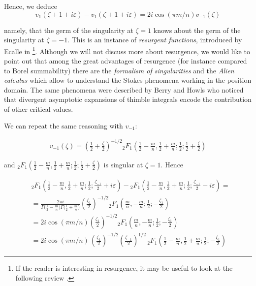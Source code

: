 \documentclass{article}
\theoremstyle{definition}
\begin{document}
Hence, we deduce  
\begin{equation}\label{resurgent-relation-1}
    v_1(\zeta+1+i\varepsilon)-v_1(\zeta+1+i\varepsilon)=2i \cos(\pi m/n)  v_{-1}(\zeta)
\end{equation}

namely, that the germ of the singularity at $\zeta=1$ knows about the germ of the singularity at $\zeta=-1$. This is an instance of \textit{resurgent functions}, introduced by Ecalle in \cite{EcalleI}\cite{EcalleII}\cite{EcalleIII}\footnote{If the reader is interesting in resurgence, it may be useful to look at the following review \cite{diverg-resurg-i}\cite{Dorigoni}\cite{aniceto2019primer}.}. Although we will not discuss more about resurgence, we would like to point out that among the great advantages of resurgence (for instance compared to Borel summability) there are the \textit{formalism of singularities} and the \textit{Alien calculus} which allow to understand the Stokes phenomena working in the position domain. The same phenomena were described by Berry and Howls \cite{berry1991hyperasymptotics} who noticed that divergent asymptotic expansions of thimble integrals encode the contribution of other critical values.

We can repeat the same reasoning with $v_{-1}$:

\begin{align*}
    v_{-1}(\zeta)=  \left(\frac{1}{2}+\frac{\zeta}{2}\right)^{-1/2} {}_2F_1\left(\frac{1}{2}-\frac{m}{n},\frac{1}{2}+\frac{m}{n};\frac{1}{2};\frac{1}{2}+\frac{\zeta}{2}\right)
\end{align*}

and ${}_2F_1\left(\frac{1}{2}-\frac{m}{n},\frac{1}{2}+\frac{m}{n};\frac{1}{2};\frac{1}{2}+\frac{\zeta}{2}\right)$ is singular at $\zeta=1$. Hence

\begin{align*}
&{}_2F_1\left(\frac{1}{2}-\frac{m}{n},\frac{1}{2}+\frac{m}{n};\frac{1}{2};\frac{\zeta_{-1}}{2}+i\varepsilon\right)-{}_2F_1\left(\frac{1}{2}-\frac{m}{n},\frac{1}{2}+\frac{m}{n};\frac{1}{2};\frac{\zeta_{-1}}{2}-i\varepsilon\right)=\\
&=\frac{2\pi i}{\Gamma\big(\tfrac{1}{2}-\tfrac{m}{n}\big)\Gamma\big(\tfrac{1}{2}+\tfrac{m}{n}\big)} \left(\frac{\zeta_{1}}{2}\right)^{-1/2} {}_2F_1\left(\frac{m}{n},-\frac{m}{n};\frac{1}{2};-\frac{\zeta_{1}}{2}\right) \\
&=2 i\cos(\pi m/n) \left(\frac{\zeta_{1}}{2}\right)^{-1/2} {}_2F_1\left(\frac{m}{n},-\frac{m}{n};\frac{1}{2};-\frac{\zeta_{1}}{2}\right) \\
&=2i \cos(\pi m/n)\, \left(\frac{\zeta_{1}}{2}\right)^{-1/2} \left(\frac{\zeta_{-1}}{2}\right)^{1/2}\, {}_2F_1\left(\frac{1}{2}-\frac{m}{n},\frac{1}{2}+\frac{m}{n};\frac{1}{2};-\frac{\zeta_{1}}{2}\right)
\end{align*}
\end{document}
